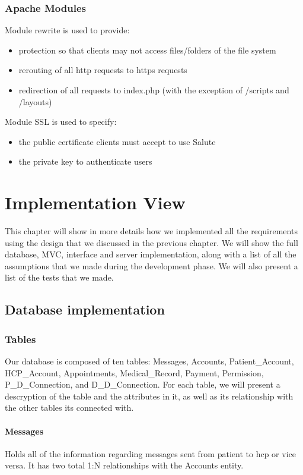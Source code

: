 \documentclass[12pt]{report}
\begin{document}
\subsection{Apache Modules}
Module rewrite is used to provide:
\begin{itemize}
\item protection so that clients may not access files/folders of the file system
\item rerouting of all http requests to https requests
\item redirection of all requests to index.php (with the exception of /scripts and /layouts)
\end{itemize}
Module SSL is used to specify:
\begin{itemize}
\item the public certificate clients must accept to use Salute
\item the private key to authenticate users
\end{itemize}

\chapter{Implementation View}
This chapter will show in more details how we implemented all the requirements using the design that we discussed in the previous chapter. We will show the full database, MVC, interface and server implementation, along with a list of all the assumptions that we made during the development phase. We will also present a list of the tests that we made.

\section{Database implementation}
\subsection{Tables}
Our database is composed of ten tables: Messages, Accounts, Patient\_Account, HCP\_Account, Appointments, Medical\_Record, Payment, Permission, P\_D\_Connection, and D\_D\_Connection.  For each table, we will present a descryption of the table and the attributes in it, as well as its relationship with the other tables its connected with.

\subsubsection{Messages}
Holds all of the information regarding messages sent from patient to hcp or vice versa. It has two total 1:N relationships with the Accounts entity.
\end{document}
